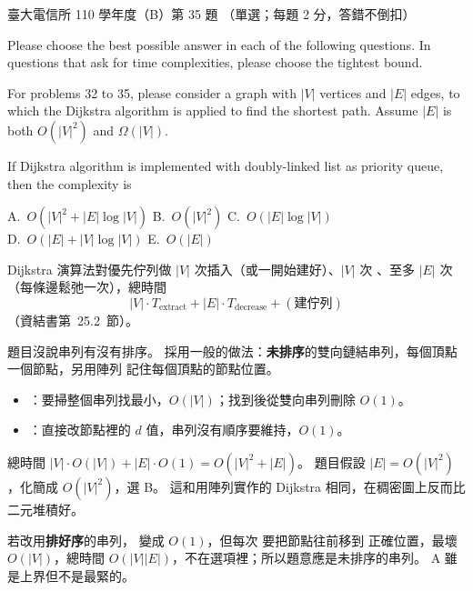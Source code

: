 \begin{pastexam}[label={px:ntu-110-comm-dsa-35}]{臺大電信所 110 學年度（B）第 35 題}
（單選；每題 2 分，答錯不倒扣）

Please choose the best possible answer in each of the following questions. In questions that ask for time complexities, please choose the tightest bound.

For problems 32 to 35, please consider a graph with $|V|$ vertices and $|E|$ edges, to which the Dijkstra algorithm is applied to find the shortest path. Assume $|E|$ is both $O(|V|^2)$ and $\Omega(|V|)$.

If Dijkstra algorithm is implemented with doubly-linked list as priority queue, then the complexity is

A.~$O(|V|^2+|E|\log|V|)$ \qquad B.~$O(|V|^2)$ \qquad C.~$O(|E|\log|V|)$\\
D.~$O(|E|+|V|\log|V|)$ \qquad E.~$O(|E|)$
\end{pastexam}

\begin{pastsoln}
Dijkstra 演算法對優先佇列做 $|V|$ 次插入（或一開始建好）、$|V|$ 次 、至多 $|E|$ 次
（每條邊鬆弛一次），總時間
\[
|V| \cdot T_{\text{extract}} + |E| \cdot T_{\text{decrease}} + (\text{建佇列})
\]
（資結書第~25.2~節）。

題目沒說串列有沒有排序。 採用一般的做法：\textbf{未排序}的雙向鏈結串列，每個頂點一個節點，另用陣列
記住每個頂點的節點位置。
\begin{itemize}
\item {}：要掃整個串列找最小，$O(|V|)$；找到後從雙向串列刪除 $O(1)$。
\item {}：直接改節點裡的 $d$ 值，串列沒有順序要維持，$O(1)$。
\end{itemize}
總時間 $|V| \cdot O(|V|) + |E| \cdot O(1) = O(|V|^2 + |E|)$。 題目假設 $|E| = O(|V|^2)$，化簡成
$O(|V|^2)$，選 B。 這和用陣列實作的 Dijkstra 相同，在稠密圖上反而比二元堆積好。

若改用\textbf{排好序}的串列， 變成 $O(1)$，但每次  要把節點往前移到
正確位置，最壞 $O(|V|)$，總時間 $O(|V||E|)$，不在選項裡；所以題意應是未排序的串列。
A 雖是上界但不是最緊的。
\end{pastsoln}
